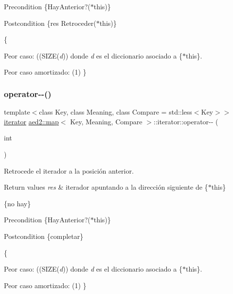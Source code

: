 \begin{DoxyPrecond}{Precondition}
\{Hay\+Anterior?($\ast$this)\} 
\end{DoxyPrecond}
\begin{DoxyPostcond}{Postcondition}
\{res  Retroceder($\ast$this)\}
\end{DoxyPostcond}
\{
\begin{DoxyItemize}
\item Peor caso\+: ((S\+I\+ZE({\itshape d})) donde {\itshape d} es el diccionario asociado a \{$\ast$this\}.
\item Peor caso amortizado\+: (1) \} 
\end{DoxyItemize}\mbox{\label{classaed2_1_1map_1_1iterator_add45e9ddbb8eeda99326cdb9ac9dd225}} 
\subsubsection{\texorpdfstring{operator-\/-\/()}{operator--()}\hspace{0.1cm}{\footnotesize\ttfamily [2/2]}}
{\footnotesize\ttfamily template$<$class Key, class Meaning, class Compare = std\+::less$<$\+Key$>$$>$ \\
\hyperlink{classaed2_1_1map_1_1iterator}{iterator} \hyperlink{classaed2_1_1map}{aed2\+::map}$<$ Key, Meaning, Compare $>$\+::iterator\+::operator-\/-\/ (\begin{DoxyParamCaption}\item[{int}]{ }\end{DoxyParamCaption})\hspace{0.3cm}{\ttfamily [inline]}}



Retrocede el iterador a la posición anterior. 


\begin{DoxyRetVals}{Return values}
{\em res} & iterador apuntando a la dirección siguiente de \{$\ast$this\}\\
\hline
\end{DoxyRetVals}
\{no hay\}

\begin{DoxyPrecond}{Precondition}
\{Hay\+Anterior?($\ast$this)\} 
\end{DoxyPrecond}
\begin{DoxyPostcond}{Postcondition}
\{completar\}
\end{DoxyPostcond}
\{
\begin{DoxyItemize}
\item Peor caso\+: ((S\+I\+ZE({\itshape d})) donde {\itshape d} es el diccionario asociado a \{$\ast$this\}.
\item Peor caso amortizado\+: (1) \} 
\end{DoxyItemize}\mbox{\label{classaed2_1_1map_1_1iterator_a712522d62f461c1eb9b02ecf248bae8c}} 

